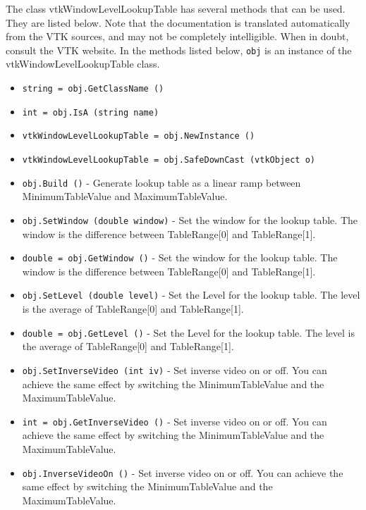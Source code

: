 The class vtkWindowLevelLookupTable has several methods that can be used.
  They are listed below.
Note that the documentation is translated automatically from the VTK sources,
and may not be completely intelligible.  When in doubt, consult the VTK website.
In the methods listed below, \verb|obj| is an instance of the vtkWindowLevelLookupTable class.
\begin{itemize}
\item  \verb|string = obj.GetClassName ()|

\item  \verb|int = obj.IsA (string name)|

\item  \verb|vtkWindowLevelLookupTable = obj.NewInstance ()|

\item  \verb|vtkWindowLevelLookupTable = obj.SafeDownCast (vtkObject o)|

\item  \verb|obj.Build ()| -  Generate lookup table as a linear ramp between MinimumTableValue
 and MaximumTableValue.

\item  \verb|obj.SetWindow (double window)| -  Set the window for the lookup table.  The window is the difference
 between TableRange[0] and TableRange[1].

\item  \verb|double = obj.GetWindow ()| -  Set the window for the lookup table.  The window is the difference
 between TableRange[0] and TableRange[1].

\item  \verb|obj.SetLevel (double level)| -  Set the Level for the lookup table.  The level is the average of
 TableRange[0] and TableRange[1].

\item  \verb|double = obj.GetLevel ()| -  Set the Level for the lookup table.  The level is the average of
 TableRange[0] and TableRange[1].

\item  \verb|obj.SetInverseVideo (int iv)| -  Set inverse video on or off.  You can achieve the same effect by
 switching the MinimumTableValue and the MaximumTableValue.

\item  \verb|int = obj.GetInverseVideo ()| -  Set inverse video on or off.  You can achieve the same effect by
 switching the MinimumTableValue and the MaximumTableValue.

\item  \verb|obj.InverseVideoOn ()| -  Set inverse video on or off.  You can achieve the same effect by
 switching the MinimumTableValue and the MaximumTableValue.


\end{itemize}
